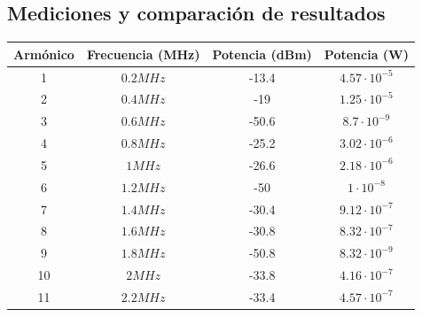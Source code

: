 \documentclass[../../labo_tp5_main.tex]{subfiles}
\begin{document}
\subsection{Mediciones y comparación de resultados}
\begin{table}[H] %
	\centering
 		\begin{tabular}{||c c c c||} 
 			\hline
			Armónico & Frecuencia (MHz) & Potencia (dBm) & Potencia (W)\\ [0.5ex] 
 			\hline\hline
			1 & $0.2MHz$ & -13.4 & $4.57\cdot 10^{-5}$\\
			2 & $0.4MHz$ & -19 & $1.25\cdot 10^{-5}$\\
			3 & $0.6MHz$ & -50.6 & $8.7\cdot 10^{-9}$\\
			4 & $0.8MHz$ & -25.2 & $3.02\cdot 10^{-6}$\\
			5 & $1MHz$ & -26.6 & $2.18\cdot 10^{-6}$\\
			6 & $1.2MHz$ & -50 & $1\cdot 10^{-8}$\\
			7 & $1.4MHz$ & -30.4 & $9.12\cdot 10^{-7}$\\
			8 & $1.6MHz$ & -30.8 & $8.32\cdot 10^{-7}$\\
			9 & $1.8MHz$ & -50.8 & $8.32\cdot 10^{-9}$\\
			10 & $2MHz$ & -33.8 & $4.16\cdot 10^{-7}$\\
			11 & $2.2MHz$ & -33.4 & $4.57\cdot 10^{-7}$\\[1ex] 
			\hline
		\end{tabular}
\end{table}
\end{document}
